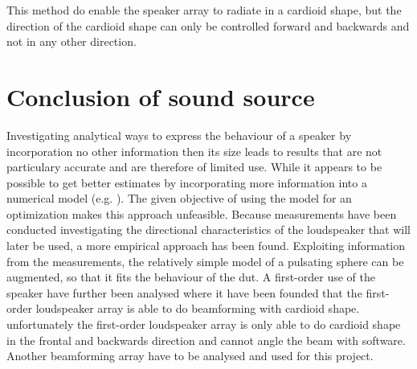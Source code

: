 This method do enable the speaker array to radiate in a cardioid shape, but the direction of the cardioid shape can only be controlled forward and backwards and not in any other direction.

\section{Conclusion of sound source}
Investigating analytical ways to express the behaviour of a speaker by incorporation no other information then its size leads to results that are not particulary accurate and are therefore of limited use. While it appears to be possible to get better estimates by incorporating more information into a numerical model (e.g. \citep{vanderkooy10}). The given objective of using the model for an optimization makes this approach unfeasible. Because measurements have been conducted investigating the directional characteristics of the loudspeaker that will later be used, a more empirical approach has been found. Exploiting information from the measurements, the relatively simple model of a pulsating sphere can be augmented, so that it fits the behaviour of the \gls{dut}. A first-order use of the speaker have further been analysed where it have been founded that the first-order loudspeaker array is able to do beamforming with cardioid shape. unfortunately the first-order loudspeaker array is only able to do cardioid shape in the frontal and backwards direction and cannot angle the beam with software. Another beamforming array have to be analysed and used for this project.